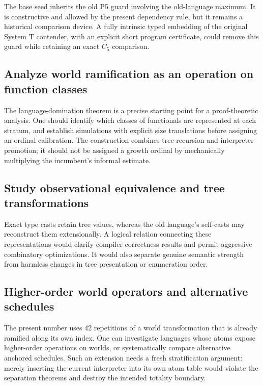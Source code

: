 \documentclass[11pt]{article}
\theoremstyle{definition}
\theoremstyle{remark}
\begin{document}
The base seed inherits the old P5 guard involving the old-language maximum.
It is constructive and allowed by the present dependency rule, but it remains
a historical comparison device. A fully intrinsic typed embedding of the
original System T contender, with an explicit short program certificate,
could remove this guard while retaining an exact $C_5$ comparison.

\subsection{Analyze world ramification as an operation on function classes}

The language-domination theorem is a precise starting point for a
proof-theoretic analysis. One should identify which classes of functionals
are represented at each stratum, and establish simulations with explicit
size translations before assigning an ordinal calibration. The construction
combines tree recursion and interpreter promotion; it should not be assigned
a growth ordinal by mechanically multiplying the incumbent's informal
estimate.

\subsection{Study observational equivalence and tree transformations}

Exact type casts retain tree values, whereas the old language's self-casts
may reconstruct them extensionally. A logical relation connecting these
representations would clarify compiler-correctness results and permit
aggressive combinatory optimizations. It would also separate genuine
semantic strength from harmless changes in tree presentation or enumeration
order.

\subsection{Higher-order world operators and alternative schedules}

The present number uses 42 repetitions of a world transformation that is
already ramified along its own index. One can investigate languages whose
atoms expose higher-order operations on worlds, or systematically compare
alternative anchored schedules. Such an extension needs a fresh stratification
argument: merely inserting the current interpreter into its own atom table
would violate the separation theorems and destroy the intended totality
boundary.
\end{document}
